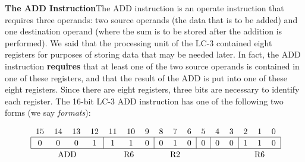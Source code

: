\documentclass{patt}
\begin{document}
\begin{example}

{\sffamily\footnotesize\bfseries\fontsize{10}{12}\selectfont The ADD
Instruction\quad}The ADD instruction is an operate instruction that requires 
three operands: two source operands (the data that is
to be added) and one destination operand (where the sum is to be stored after
the addition is performed).  We said that the processing unit of the LC-3 
contained eight registers for purposes of storing data that may
be needed later.  In fact, the ADD instruction {\bf requires} that at least one
of the two source operands is
contained in one of these registers, and that the result of the ADD is put
into one of these eight
registers.  Since there are eight registers, three bits are necessary to
identify each register.
The 16-bit LC-3 ADD instruction has one of the following two forms 
(we say {\em formats}):\par
\noindent\hspace*{-9pt}\begin{minipage}{28pc}
\fontsize{9.5}{12}\selectfont
\begin{equation*}
\mbox{\renewcommand{\tabcolsep}{6pt}
\begin{tabular}
{cccccccccccccccc}
15 & 14 & 13 & 12 & 11 & 10 & 9 & 8 & 7 & 6 & 5 & 4 & 3 & 2 & 1 & 0 \\
\hline
\multicolumn{1}{|c}{\rule{0pt}{10pt}0\rule{0pt}{10pt}}&
\multicolumn{1}{c}{0}&
\multicolumn{1}{c}{0}&
\multicolumn{1}{c}{1}&
\multicolumn{1}{|c}{1}&
\multicolumn{1}{c}{1}&
\multicolumn{1}{c}{0}&
\multicolumn{1}{|c}{0}&
\multicolumn{1}{c}{1}&
\multicolumn{1}{c}{0}&
\multicolumn{1}{|c}{0}&
\multicolumn{1}{|c}{0}&
\multicolumn{1}{c}{0}&
\multicolumn{1}{|c}{1}&
\multicolumn{1}{c}{1}&
\multicolumn{1}{c|}{0}\\
\hline
\multicolumn{4}{c}{\rule{0pt}{10pt}ADD\rule{0pt}{10pt}} &
\multicolumn{3}{c}{R6} &
\multicolumn{3}{c}{R2} &
\multicolumn{3}{c}{} &
\multicolumn{3}{c}{R6} \\
\end{tabular}}
\end{equation*}
\vspace{-5pt}
\end{minipage}


\end{example}
\end{document}
